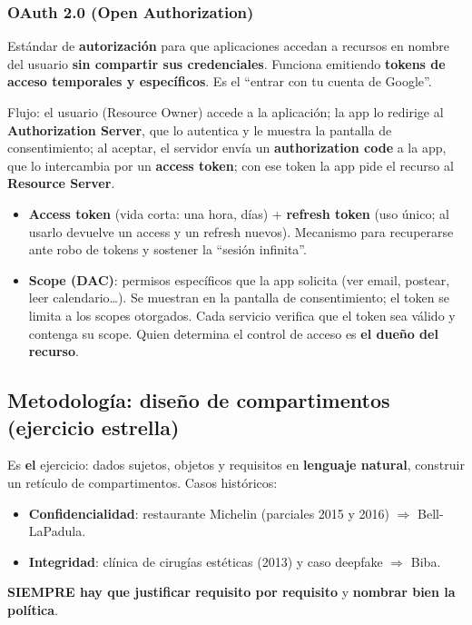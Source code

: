 \documentclass[../main.tex]{subfiles}
\begin{document}
\subsubsection{OAuth 2.0 (Open Authorization)}

Estándar de \textbf{autorización} para que aplicaciones accedan a recursos en nombre del usuario \textbf{sin compartir sus credenciales}. Funciona emitiendo \textbf{tokens de acceso temporales y específicos}. Es el ``entrar con tu cuenta de Google''.

Flujo: el usuario (Resource Owner) accede a la aplicación; la app lo redirige al \textbf{Authorization Server}, que lo autentica y le muestra la pantalla de consentimiento; al aceptar, el servidor envía un \textbf{authorization code} a la app, que lo intercambia por un \textbf{access token}; con ese token la app pide el recurso al \textbf{Resource Server}.

\begin{itemize}[nosep]
  \item \textbf{Access token} (vida corta: una hora, días) + \textbf{refresh token} (uso único; al usarlo devuelve un access y un refresh nuevos). Mecanismo para recuperarse ante robo de tokens y sostener la ``sesión infinita''.
  \item \textbf{Scope (DAC)}: permisos específicos que la app solicita (ver email, postear, leer calendario\dots). Se muestran en la pantalla de consentimiento; el token se limita a los scopes otorgados. Cada servicio verifica que el token sea válido y contenga su scope. Quien determina el control de acceso es \textbf{el dueño del recurso}.
\end{itemize}

\subsection{Metodología: diseño de compartimentos (ejercicio estrella)}

\begin{examen}
Es \textbf{el} ejercicio: dados sujetos, objetos y requisitos en \textbf{lenguaje natural}, construir un retículo de compartimentos. Casos históricos:
\begin{itemize}[nosep]
  \item \textbf{Confidencialidad}: restaurante Michelin (parciales 2015 y 2016) $\Rightarrow$ Bell-LaPadula.
  \item \textbf{Integridad}: clínica de cirugías estéticas (2013) y caso deepfake $\Rightarrow$ Biba.
\end{itemize}
\textbf{SIEMPRE hay que justificar requisito por requisito} y \textbf{nombrar bien la política}.
\end{examen}
\end{document}

